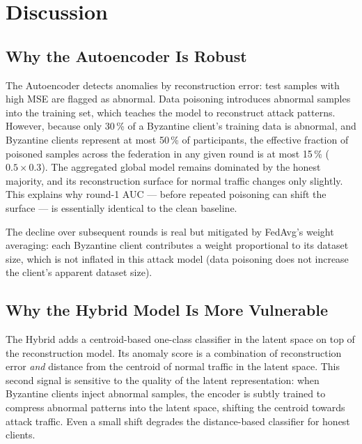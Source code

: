 \documentclass[11pt,a4paper]{article}
\begin{document}
\section{Discussion}

\subsection{Why the Autoencoder Is Robust}

The Autoencoder detects anomalies by reconstruction error: test samples with high MSE
are flagged as abnormal.
Data poisoning introduces abnormal samples into the training set, which teaches the model
to reconstruct attack patterns.
However, because only 30\,\% of a Byzantine client's training data is abnormal, and
Byzantine clients represent at most 50\,\% of participants, the effective fraction of
poisoned samples across the federation in any given round is at most 15\,\%
($0.5 \times 0.3$).
The aggregated global model remains dominated by the honest majority, and its reconstruction
surface for normal traffic changes only slightly.
This explains why round-1 AUC --- before repeated poisoning can shift the surface --- is
essentially identical to the clean baseline.

The decline over subsequent rounds is real but mitigated by FedAvg's weight averaging:
each Byzantine client contributes a weight proportional to its dataset size,
which is not inflated in this attack model (data poisoning does not increase the client's
apparent dataset size).

\subsection{Why the Hybrid Model Is More Vulnerable}

The Hybrid adds a centroid-based one-class classifier in the latent space on top of the
reconstruction model.
Its anomaly score is a combination of reconstruction error \emph{and} distance from the
centroid of normal traffic in the latent space.
This second signal is sensitive to the quality of the latent representation: when
Byzantine clients inject abnormal samples, the encoder is subtly trained to compress
abnormal patterns into the latent space, shifting the centroid towards attack traffic.
Even a small shift degrades the distance-based classifier for honest clients.
\end{document}
